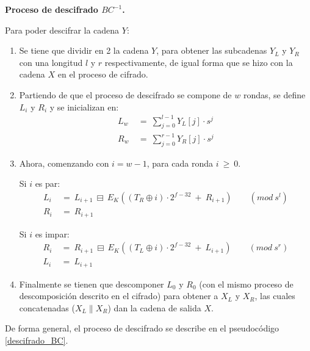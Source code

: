 \textbf{Proceso de descifrado $BC^{-1}$.}

Para poder descifrar la cadena $Y$:

\begin{enumerate}

  \item Se tiene que dividir en 2 la cadena $Y$, para obtener las subcadenas
    $Y_L$ y $Y_R$ con una longitud $l$ y $r$ respectivamente, de igual forma
    que se hizo con la cadena $X$ en el proceso de cifrado.

  \item Partiendo de que el proceso de descifrado se compone de $w$ rondas,
    se define $L_i$ y $R_i$ y se inicializan en:
    \begin{align}
      L_w\: &=\: \sum_{j=0}^{l-1} Y_L[j] \cdot s^j \\
      R_w\: &=\: \sum_{j=0}^{r-1} Y_R[j] \cdot s^j
    \end{align}

  \item Ahora, comenzando con $i=w-1$, para cada ronda $i\: \geq\: 0$.

    Si $i$ es par:
    \begin{align}
      L_i\: &=\: L_{i+1}\: \boxminus\:
                E_K((T_R \oplus i) \cdot 2^{f-32}\: +\: R_{i+1})\qquad
                (mod\ s^l) \\
      R_i\: &=\: R_{i+1}
    \end{align}

    Si $i$ es impar:
    \begin{align}
      R_i\: &=\: R_{i+1}\: \boxminus\:
                E_K((T_L \oplus i) \cdot 2^{f-32}\: +\: L_{i+1})\qquad
                (mod\ s^r) \\
      L_i\: &=\: L_{i+1}
    \end{align}

  \item Finalmente se tienen que descomponer $L_0$ y $R_0$ (con el mismo
    proceso de descomposición descrito en el cifrado) para obtener a $X_L$ y
    $X_R$, las cuales concatenadas ($X_L \parallel X_R$) dan la cadena de
    salida $X$.

\end{enumerate}

De forma general, el proceso de descifrado se describe en el pseudocódigo
\ref{descifrado_BC}.

